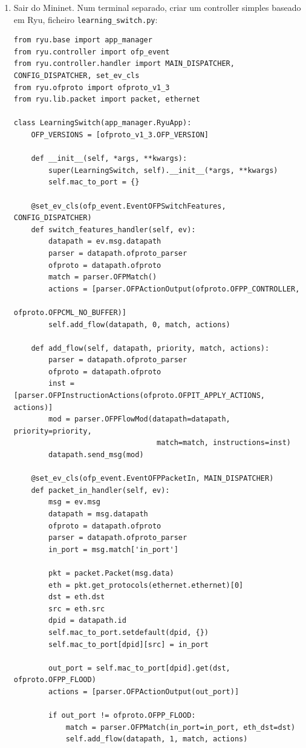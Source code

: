 \documentclass[11pt,a4paper]{article}
\begin{document}
\begin{enumerate}[label=\arabic*.,resume]
  \item Sair do Mininet. Num terminal separado, criar um controller simples baseado em Ryu, ficheiro \texttt{learning\_switch.py}:
\begin{lstlisting}
from ryu.base import app_manager
from ryu.controller import ofp_event
from ryu.controller.handler import MAIN_DISPATCHER, CONFIG_DISPATCHER, set_ev_cls
from ryu.ofproto import ofproto_v1_3
from ryu.lib.packet import packet, ethernet

class LearningSwitch(app_manager.RyuApp):
    OFP_VERSIONS = [ofproto_v1_3.OFP_VERSION]

    def __init__(self, *args, **kwargs):
        super(LearningSwitch, self).__init__(*args, **kwargs)
        self.mac_to_port = {}

    @set_ev_cls(ofp_event.EventOFPSwitchFeatures, CONFIG_DISPATCHER)
    def switch_features_handler(self, ev):
        datapath = ev.msg.datapath
        parser = datapath.ofproto_parser
        ofproto = datapath.ofproto
        match = parser.OFPMatch()
        actions = [parser.OFPActionOutput(ofproto.OFPP_CONTROLLER,
                                           ofproto.OFPCML_NO_BUFFER)]
        self.add_flow(datapath, 0, match, actions)

    def add_flow(self, datapath, priority, match, actions):
        parser = datapath.ofproto_parser
        ofproto = datapath.ofproto
        inst = [parser.OFPInstructionActions(ofproto.OFPIT_APPLY_ACTIONS, actions)]
        mod = parser.OFPFlowMod(datapath=datapath, priority=priority,
                                 match=match, instructions=inst)
        datapath.send_msg(mod)

    @set_ev_cls(ofp_event.EventOFPPacketIn, MAIN_DISPATCHER)
    def packet_in_handler(self, ev):
        msg = ev.msg
        datapath = msg.datapath
        ofproto = datapath.ofproto
        parser = datapath.ofproto_parser
        in_port = msg.match['in_port']

        pkt = packet.Packet(msg.data)
        eth = pkt.get_protocols(ethernet.ethernet)[0]
        dst = eth.dst
        src = eth.src
        dpid = datapath.id
        self.mac_to_port.setdefault(dpid, {})
        self.mac_to_port[dpid][src] = in_port

        out_port = self.mac_to_port[dpid].get(dst, ofproto.OFPP_FLOOD)
        actions = [parser.OFPActionOutput(out_port)]

        if out_port != ofproto.OFPP_FLOOD:
            match = parser.OFPMatch(in_port=in_port, eth_dst=dst)
            self.add_flow(datapath, 1, match, actions)


\end{lstlisting}
\end{enumerate}
\end{document}
